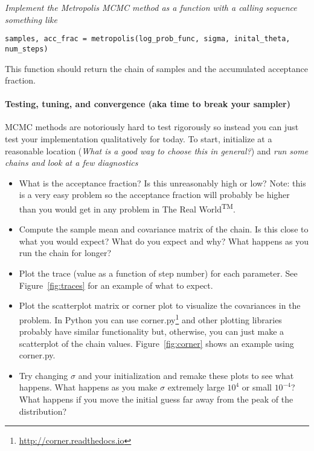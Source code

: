 \documentclass[letterpaper,12pt,preprint]{hack_aastex}
\newcommand{\question}{\emph}
\begin{document}
\question{Implement the Metropolis MCMC method as a function with a calling
sequence something like}
\begin{center}
\texttt{samples, acc\_frac = metropolis(log\_prob\_func, sigma, inital\_theta,
num\_steps)}
\end{center}
This function should return the chain of samples and the accumulated
acceptance fraction.


\paragraph{Testing, tuning, and convergence (aka time to break your sampler)}

MCMC methods are notoriously hard to test rigorously so instead you can just
test your implementation qualitatively for today.
To start, initialize at a reasonable location (\question{What is a good way to
choose this in general?}) and \question{run some chains and look at a few
diagnostics}
\begin{itemize}

\item What is the acceptance fraction? Is this unreasonably high or low?
Note: this is a very easy problem so the acceptance fraction will
probably be higher than you would get in any problem in The Real
World\textsuperscript{\textsf{TM}}.

\item Compute the sample mean and covariance matrix of the chain. Is this
close to what you would expect? What do you expect and why? What happens as
you run the chain for longer?

\item Plot the trace (value as a function of step number) for each parameter.
See Figure~\ref{fig:traces} for an example of what to expect.

\item Plot the scatterplot matrix or corner plot to visualize the covariances
in the problem.
In Python you can use
\textsf{corner.py}\footnote{\url{http://corner.readthedocs.io}} and other
plotting libraries probably have similar functionality but, otherwise, you can
just make a scatterplot of the chain values.
Figure~\ref{fig:corner} shows an example using \textsf{corner.py}.

\item Try changing $\sigma$ and your initialization and remake these plots to
see what happens.
What happens as you make $\sigma$ extremely large $10^4$ or small $10^{-4}$?
What happens if you move the initial guess far away from the peak of the
distribution?

\end{itemize}
\end{document}
